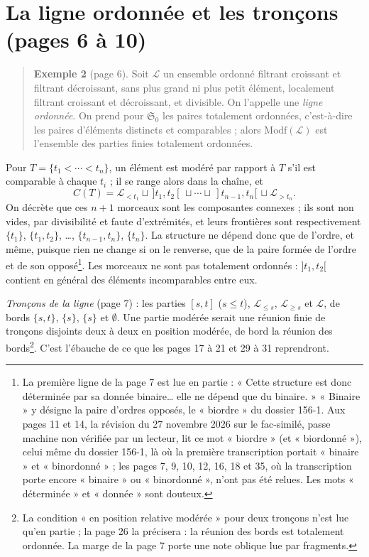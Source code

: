 \documentclass[11pt,a4paper]{article}
\begin{document}
\section*{La ligne ordonnée et les tronçons (pages 6 à 10)}

\begin{quote}
\textbf{Exemple 2} (page 6). Soit $\mathcal{L}$ un ensemble ordonné filtrant
croissant et filtrant décroissant, sans plus grand ni plus petit élément,
localement filtrant croissant et décroissant, et divisible. On l'appelle une
\emph{ligne ordonnée}. On prend pour $\mathfrak{S}_{0}$ les paires totalement
ordonnées, c'est-à-dire les paires d'éléments distincts et comparables ; alors
$\mathrm{Modf}(\mathcal{L})$ est l'ensemble des parties finies totalement
ordonnées.
\end{quote}

Pour $T = \{t_{1} < \cdots < t_{n}\}$, un élément est modéré par rapport à $T$
s'il est comparable à chaque $t_{i}$ ; il se range alors dans la chaîne, et
\[
C(T) = \mathcal{L}_{<t_{1}} \sqcup \,]t_{1}, t_{2}[\, \sqcup \cdots \sqcup
\,]t_{n-1}, t_{n}[\, \sqcup \mathcal{L}_{>t_{n}} .
\]
On décrète que ces $n+1$ morceaux sont les composantes connexes ; ils sont non
vides, par divisibilité et faute d'extrémités, et leurs frontières sont
respectivement $\{t_{1}\}$, $\{t_{1}, t_{2}\}$, \dots, $\{t_{n-1}, t_{n}\}$,
$\{t_{n}\}$. La structure ne dépend donc que de l'ordre, et même, puisque
rien ne change si on le renverse, que de la paire formée de l'ordre et de son
opposé\footnote{La première ligne de la page 7 est lue en partie : « Cette
structure est donc déterminée par sa donnée binaire\dots{} elle ne dépend que du
binaire. » « Binaire » y désigne la paire d'ordres opposés, le « biordre » du
dossier 156-1. Aux pages 11 et 14, la révision du 27 novembre 2026 sur le
fac-similé, passe machine non vérifiée par un lecteur, lit ce mot « biordre »
(et « biordonné »), celui même du dossier 156-1, là où la première
transcription portait « binaire » et « binordonné » ; les pages 7, 9, 10, 12,
16, 18 et 35, où la transcription porte encore « binaire » ou « binordonné »,
n'ont pas été relues. Les mots « déterminée » et « donnée » sont douteux.}. Les morceaux ne sont pas totalement ordonnés :
$]t_{1}, t_{2}[$ contient en général des éléments incomparables entre eux.

\emph{Tronçons de la ligne} (page 7) : les parties $[s,t]$ ($s \leq t$),
$\mathcal{L}_{\leq s}$, $\mathcal{L}_{\geq s}$ et $\mathcal{L}$, de bords
$\{s,t\}$, $\{s\}$, $\{s\}$ et $\emptyset$. Une partie modérée serait une
réunion finie de tronçons disjoints deux à deux en position modérée, de bord la
réunion des bords\footnote{La condition « en position relative modérée » pour
deux tronçons n'est lue qu'en partie ; la page 26 la précisera : la réunion
des bords est totalement ordonnée. La marge de la page 7 porte une note
oblique lue par fragments.}. C'est l'ébauche de ce que les pages 17 à 21 et 29
à 31 reprendront.
\end{document}
